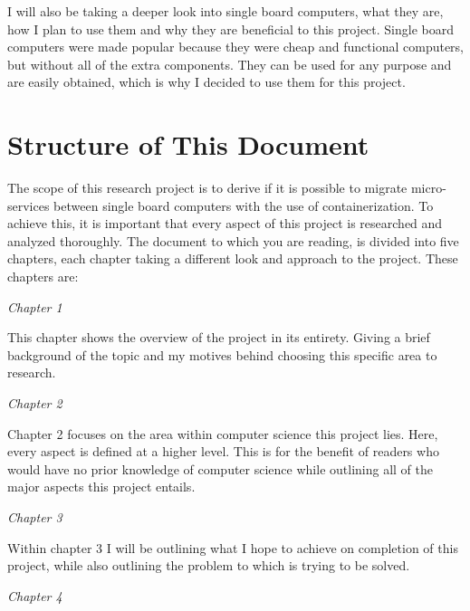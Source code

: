 I will also be taking a deeper look into single board computers, what they are, how I plan to use them and why they are beneficial to this project. Single board computers were made popular because they were cheap and functional computers, but without all of the extra components. They can be used for any purpose and are easily obtained, which is why I decided to use them for this project.

\section{Structure of This Document}
The scope of this research project is to derive if it is possible to migrate micro-services between single board computers with the use of containerization. To achieve this, it is important that every aspect of this project is researched and analyzed thoroughly. The document to which you are reading, is divided into five chapters, each chapter taking a different look and approach to the project. These chapters are:

\textit{Chapter 1}

This chapter shows the overview of the project in its entirety. Giving a brief background of the topic and my motives behind choosing this specific area to research. 

\textit{Chapter 2}

Chapter 2 focuses on the area within computer science this project lies. Here, every aspect is defined at a higher level. This is for the benefit of readers who would have no prior knowledge of computer science while outlining all of the major aspects this project entails.

\textit{Chapter 3}

Within chapter 3 I will be outlining what I hope to achieve on completion of this project, while also outlining the problem to which is trying to be solved.

\textit{Chapter 4}

